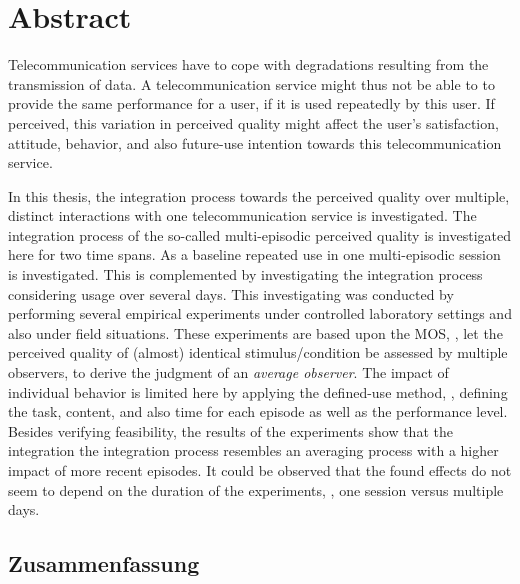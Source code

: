 
\chapter*{Abstract}
Telecommunication services have to cope with degradations resulting from the transmission of data.
A telecommunication service might thus not be able to to provide the same performance for a user, if it is used repeatedly by this user.
If perceived, this variation in perceived quality might affect the user's satisfaction, attitude, behavior, and also future-use intention towards this telecommunication service.

In this thesis, the integration process towards the perceived quality over multiple, distinct interactions with one telecommunication service is investigated.
The integration process of the so-called multi-episodic perceived quality is investigated here for two time spans.
As a baseline repeated use in one multi-episodic session is investigated. %
This is complemented by investigating the integration process considering usage over several days.
This investigating was conducted by performing several empirical experiments under controlled laboratory settings and also under field situations.
These experiments are based upon the \acs{MOS}, \ie, let the perceived quality of (almost) identical stimulus/condition be assessed by multiple observers, to derive the judgment of an \emph{average observer}.
The impact of individual behavior is limited here by applying the defined-use method, \ie, defining the task, content, and also time for each episode as well as the performance level.
Besides verifying feasibility, the results of the experiments show that the integration the integration process resembles an averaging process with a higher impact of more recent episodes.
It could be observed that the found effects do not seem to depend on the duration of the experiments, \ie, one session versus multiple days.


\begin{otherlanguage}{ngerman}
\chapter*{Zusammenfassung}


\end{otherlanguage}
